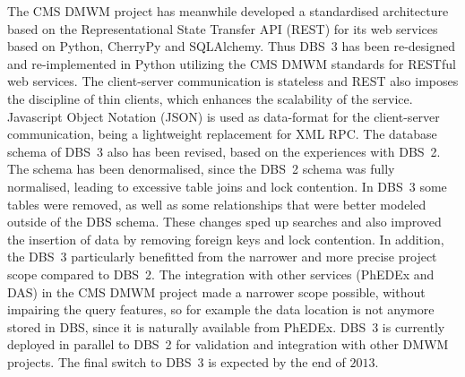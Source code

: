 The CMS DMWM project has meanwhile developed a standardised architecture based on the Representational State Transfer API (REST) \cite{REST} for its web services based on Python, CherryPy and SQLAlchemy. Thus DBS~3 has been re-designed and re-implemented in Python utilizing the CMS DMWM standards for RESTful web services. The client-server communication is stateless and REST also imposes the discipline of thin clients, which enhances the scalability of the service. Javascript Object Notation (JSON) is used as data-format for the client-server communication, being a lightweight replacement for XML RPC. The database schema of DBS~3 also has been revised, based on the experiences with DBS~2. The schema has been denormalised, since the DBS~2 schema was fully normalised, leading to excessive table joins and lock contention. In DBS~3 some tables were removed, as well as some relationships that were better modeled outside of the DBS schema. These changes sped up searches and also improved the insertion of data by removing foreign keys and lock contention. In addition, the DBS~3 particularly benefitted from the narrower and more precise project scope compared to DBS~2. The integration with other services (PhEDEx and DAS) in the CMS DMWM project made a narrower scope possible, without impairing the query features, so for example the data location is not anymore stored in DBS, since it is naturally available from PhEDEx. DBS~3 is currently deployed in parallel to DBS~2 for validation and integration with other DMWM projects. The final switch to DBS~3 is expected by the end of $2013$.

